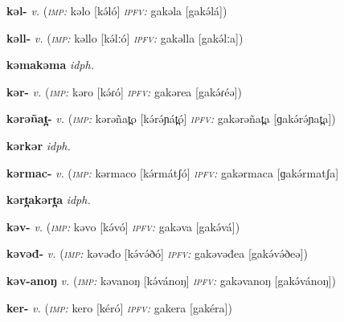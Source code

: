 \newentry
\headword\textbf{kəl-}  
\ipa{[kə́l-]}
\synpos\textit{v.} 
\imperative(\textit {\textsc{imp:}} kəlo [kə́ló]
\imperfective\textit{\textsc{ipfv:}} gakəla [gakə́lá])

\newentry
\headword\textbf{kəll-}  
\ipa{[kə́lː-]}
\synpos\textit{v.} 
\imperative(\textit {\textsc{imp:}} kəllo [kə́lːó]
\imperfective\textit{\textsc{ipfv:}} gakəlla [gakə́lːa])


\newentry
\headword\textbf{kəmakəma}  
\ipa{[kəmakəma]}
\synpos\textit{idph.} 

\newentry
\headword\textbf{kər-}  
\ipa{[kə́ɾ-]}
\synpos\textit{v.} 
\imperative(\textit {\textsc{imp:}} kəro [kə́ɾó]
\imperfective\textit{\textsc{ipfv:}} gakərea [gakə́ɾéə])


\newentry
\headword\textbf{kərəñat̪-}  
\ipa{[kə́rə́ɲat̪-]}
\synpos\textit{v.} 
\imperative(\textit {\textsc{imp:}} kərəñat̪o [kə́rə́ɲát̪ó]
\imperfective\textit{\textsc{ipfv:}} gakərəñat̪a [ɡakə́rə́ɲat̪a])


\newentry
\headword\textbf{kərkər}  
\ipa{[kərkər}
\synpos\textit{idph.} 

\newentry
\headword\textbf{kərmac-}  
\ipa{[kə́rmatʃ-]}
\synpos\textit{v.} 
\imperative(\textit {\textsc{imp:}} kərmaco [kə́rmátʃó]
\imperfective\textit{\textsc{ipfv:}} gakərmaca [ɡakə́rmatʃa]

\newentry
\headword\textbf{kərt̪akərt̪a}  
\ipa{[kərt̪akərt̪a}
\synpos\textit{idph.} 

\newentry
\headword\textbf{kəv-}  
\ipa{[kə́v-]}
\synpos\textit{v.} 
\imperative(\textit {\textsc{imp:}} kəvo [kə́vó]
\imperfective\textit{\textsc{ipfv:}} gakəva [gakə́vá])


\newentry
\headword\textbf{kəvəđ-}  
\ipa{[kə́və́ð-]}
\synpos\textit{v.} 
\imperative(\textit {\textsc{imp:}} kəvəđo [kə́və́ðó]
\imperfective\textit{\textsc{ipfv:}} gakəvəđea [gakə́və́ðeə])  

\newentry
\headword\textbf{kəv-anoŋ}  
\ipa{[kə́v-ánoŋ]}
\synpos\textit{v.} 
\imperative(\textit {\textsc{imp:}} kəvanoŋ [kə́vánoŋ]
\imperfective\textit{\textsc{ipfv:}} gakəvanoŋ [gakə́vánoŋ]) 

\newentry
\headword\textbf{ker-}  
\ipa{[kér-]}
\synpos\textit{v.} 
\imperative(\textit {\textsc{imp:}} kero [kéró]
\imperfective\textit{\textsc{ipfv:}} gakera [gakéra])

